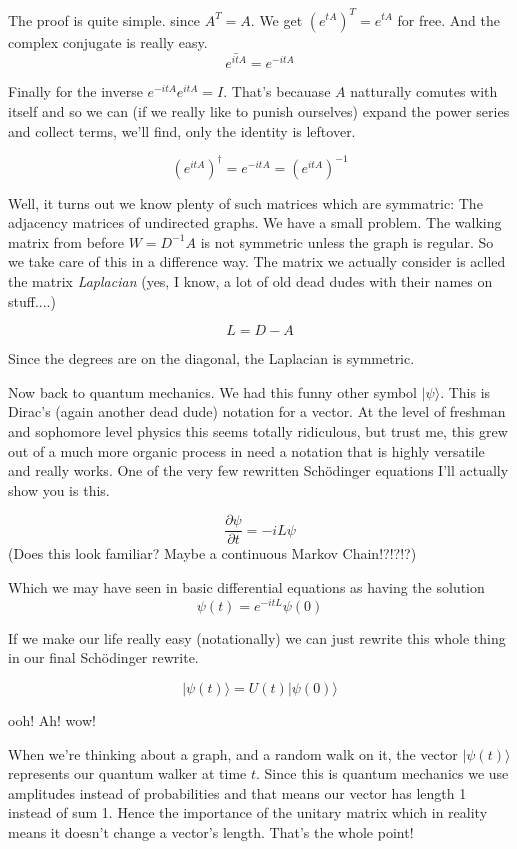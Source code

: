 \documentclass{article}
\theoremstyle{definition}
\theoremstyle{remark}
\newcommand{\ket}[1]{|#1\rangle}
\begin{document}
The proof is quite simple. since $A^T = A$.  We get  $\left(e^{tA}\right)^T = e^{tA}$ for free. And the complex conjugate is really easy. 
\[
\bar{e^{itA}} = e^{-itA}
\]

Finally for the inverse $e^{-itA}e^{itA} = I$.  That's becauase $A$ natturally comutes with itself and so we can (if we really like to punish ourselves) expand the power series and collect terms, we'll find, only the identity is leftover.

\[
\left(e^{itA}\right)^{\dag} = e^{-itA} = \left(e^{itA}\right)^{-1}
\]

Well, it turns out we know plenty of such matrices which are symmatric: The adjacency matrices of undirected graphs.  We have a small problem.  The walking matrix from before $W = D^{-1}A$ is not symmetric unless the graph is regular.  So we take care of this in a difference way.  The matrix we actually consider is aclled the matrix \emph{Laplacian} (yes, I know, a lot of old dead dudes with their names on stuff....)

\[
L = D - A
\]  

Since the degrees are on the diagonal, the Laplacian is symmetric.  

Now back to quantum mechanics.  We had this funny other symbol $\ket{\psi}$.  This is Dirac's (again another dead dude) notation for a vector.  At the level of freshman and sophomore level physics this seems totally ridiculous, but trust me, this grew out of a much more organic process in need a notation that is highly versatile and really works.  One of the very few rewritten Sch\"{o}dinger equations I'll actually show you is this.

\[
\frac{\partial \psi}{\partial t} = -iL\psi  
\]
(Does this look familiar?  Maybe a continuous Markov Chain!?!?!?)

Which we may have seen in basic differential equations as having the solution
\[
\psi(t) = e^{-itL}\psi(0)
\]

If we make our life really easy (notationally) we can just rewrite this whole thing in our final Sch\"{o}dinger rewrite.


\[
\ket{\psi(t)} = U(t) \ket{\psi(0)}
\]

ooh!  Ah!  wow!

When we're thinking about a graph, and a random walk on it, the vector $\ket{\psi(t)}$ represents our quantum walker at time $t$.  Since this is quantum mechanics we use amplitudes instead of probabilities and that means our vector has length 1 instead of sum 1.  Hence the importance of the unitary matrix which in reality means it doesn't change a vector's length.  That's the whole point!  
\end{document}
